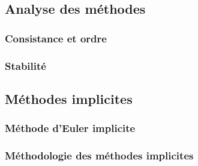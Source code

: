     \subsection{Analyse des méthodes}
      \subsubsection{Consistance et ordre}
      \subsubsection{Stabilité}
    \subsection{Méthodes implicites}
      \subsubsection{Méthode d'Euler implicite}
      \subsubsection{Méthodologie des méthodes implicites}
